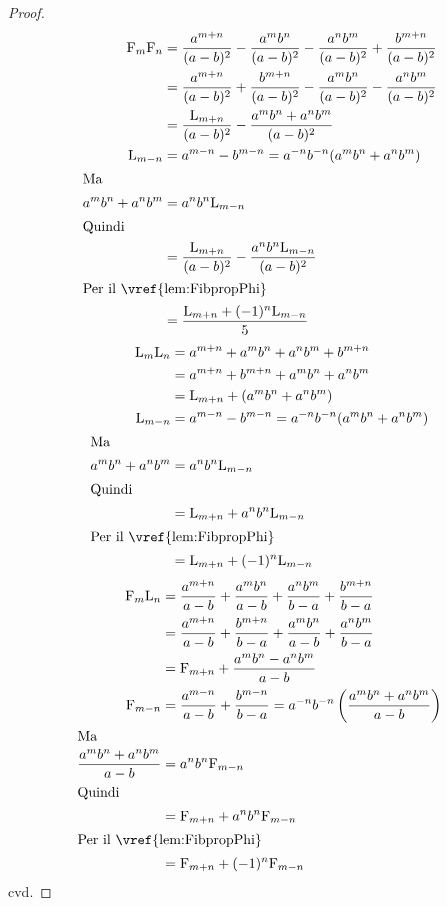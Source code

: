\begin{proof}
\begin{align*}
	\Fib{m}\Fib{n}={}&\dfrac{a^{m+n}}{(a-b)^2}-\dfrac{a^mb^n}{(a-b)^2}-\dfrac{a^nb^m}{(a-b)^2}+\dfrac{b^{m+n}}{(a-b)^2}\\
	={}&\dfrac{a^{m+n}}{(a-b)^2}+\dfrac{b^{m+n}}{(a-b)^2}-\dfrac{a^mb^n}{(a-b)^2}-\dfrac{a^nb^m}{(a-b)^2}\\
	={}&\dfrac{\Luc{m+n}}{(a-b)^2}-\dfrac{a^mb^n+a^nb^m}{(a-b)^2}\\
	\Luc{m-n}={}&a^{m-n}-b^{m-n}=a^{-n}b^{-n}(a^mb^n+a^nb^m)\\
	\intertext{Ma}
	a^mb^n+a^nb^m={}&a^{n}b^{n}\Luc{m-n}\\
	\intertext{Quindi}
	={}&\dfrac{\Luc{m+n}}{(a-b)^2}-\dfrac{a^{n}b^{n}\Luc{m-n}}{(a-b)^2}\\
	\intertext{Per il~\vref{lem:FibpropPhi}}
	={}&\dfrac{\Luc{m+n}+(-1)^{n}\Luc{m-n}}{5}
\end{align*}
\begin{align*}
	\Luc{m}\Luc{n}={}&a^{m+n}+a^mb^n+a^nb^m+b^{m+n}\\
	={}&a^{m+n}+b^{m+n}+a^mb^n+a^nb^m\\
	={}&\Luc{m+n}+(a^mb^n+a^nb^m)\\
	\Luc{m-n}={}&a^{m-n}-b^{m-n}=a^{-n}b^{-n}(a^mb^n+a^nb^m)\\
	\intertext{Ma}
	a^mb^n+a^nb^m={}&a^{n}b^{n}\Luc{m-n}\\
	\intertext{Quindi}
	={}&\Luc{m+n}+a^{n}b^{n}\Luc{m-n}\\
	\intertext{Per il~\vref{lem:FibpropPhi}}
	={}&\Luc{m+n}+(-1)^{n}\Luc{m-n}
\end{align*}
\begin{align*}
	\Fib{m}\Luc{n}={}&\dfrac{a^{m+n}}{a-b}+\dfrac{a^mb^n}{a-b}+\dfrac{a^nb^m}{b-a}+\dfrac{b^{m+n}}{b-a}\\
	={}&\dfrac{a^{m+n}}{a-b}+\dfrac{b^{m+n}}{b-a}+\dfrac{a^mb^n}{a-b}+\dfrac{a^nb^m}{b-a}\\
	={}&\Fib{m+n}+\dfrac{a^mb^n-a^nb^m}{a-b}\\
	\Fib{m-n}={}&\dfrac{a^{m-n}}{a-b}+\dfrac{b^{m-n}}{b-a}=a^{-n}b^{-n}\left(\dfrac{a^mb^n+a^nb^m}{a-b}\right)\\
	\intertext{Ma}
	\dfrac{a^mb^n+a^nb^m}{a-b}={}&a^{n}b^{n}\Fib{m-n}\\
	\intertext{Quindi}
	={}&\Fib{m+n}+a^{n}b^{n}\Fib{m-n}\\
	\intertext{Per il~\vref{lem:FibpropPhi}}
	={}&\Fib{m+n}+(-1)^{n}\Fib{m-n}
\end{align*}
cvd.
\end{proof}
